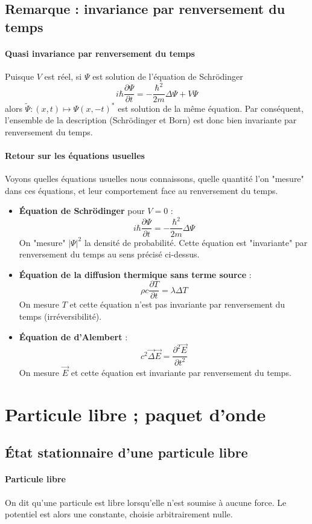 \documentclass[french]{book}
\theoremstyle{plain}
\theoremstyle{definition}
\theoremstyle{remark}
\newcommand{\st}{^*}
\begin{document}
\subsection{Remarque : invariance par renversement du temps}
\paragraph{Quasi invariance par renversement du temps} Puisque $V$ est réel, si $\Psi$ est solution de l'équation de Schrödinger $$i\hbar\frac{\partial\Psi}{\partial t}=-\frac{\hbar^2}{2m}\Delta\Psi+V\Psi$$ alors $\tilde{\Psi}:(x,t)\mapsto \Psi(x,-t)\st$ est solution de la même équation. Par conséquent, l'ensemble de la description (Schrödinger et Born) est donc bien invariante par renversement du temps.
\paragraph{Retour sur les équations usuelles}
Voyons quelles équations usuelles nous connaissons, quelle quantité l'on "mesure" dans ces équations, et leur comportement face au renversement du temps.
\begin{itemize}
	\item \textbf{Équation de Schrödinger} pour $V=0$ : $$i\hbar\frac{\partial\Psi}{\partial t}=-\frac{\hbar^2}{2m}\Delta\Psi$$ On "mesure" $\lvert\Psi\rvert^2$ la densité de probabilité. Cette équation est "invariante" par renversement du temps au sens précisé ci-dessus.
	\item \textbf{Équation de la diffusion thermique sans terme source} : $$\rho c\frac{\partial T}{\partial t}=\lambda\Delta T$$ On mesure $T$ et cette équation n'est pas invariante par renversement du temps (irréversibilité).
	\item \textbf{Équation de d'Alembert} : $$c^2\overrightarrow{\Delta}\overrightarrow{E}=\frac{\partial^2 \overrightarrow{E}}{\partial t^2}$$ On mesure $\overrightarrow{E}$ et cette équation est invariante par renversement du temps.
\end{itemize}
\section{Particule libre ; paquet d'onde}
\subsection{État stationnaire d'une particule libre}
\paragraph{Particule libre} On dit qu'une particule est libre lorsqu'elle n'est soumise à aucune force. Le potentiel est alors une constante, choisie arbitrairement nulle.
\end{document}
